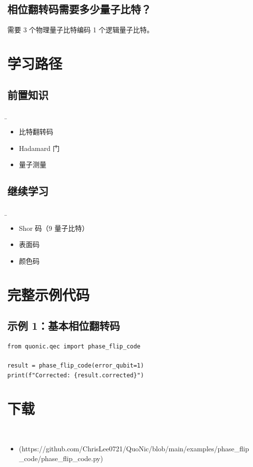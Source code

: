 \documentclass[12pt,a4paper]{article}
\begin{document}
\subsection{相位翻转码需要多少量子比特？}

需要 3 个物理量子比特编码 1 个逻辑量子比特。

\section{学习路径}

\subsection{前置知识}
\b\begin{itemize}
  \item 比特翻转码
  \item Hadamard 门
  \item 量子测量
\end{itemize}

\subsection{继续学习}
\b\begin{itemize}
  \item Shor 码（9 量子比特）
  \item 表面码
  \item 颜色码
\end{itemize}

\section{完整示例代码}

\subsection{示例 1：基本相位翻转码}

\begin{lstlisting}[style=python]
from quonic.qec import phase_flip_code

result = phase_flip_code(error_qubit=1)
print(f"Corrected: {result.corrected}")
\end{lstlisting}


\section{下载}

\begin{itemize}
  \item [phase_flip_code.py](https://github.com/ChrisLee0721/QuoNic/blob/main/examples/phase_flip_code/phase_flip_code.py)
\end{itemize}
\end{document}
